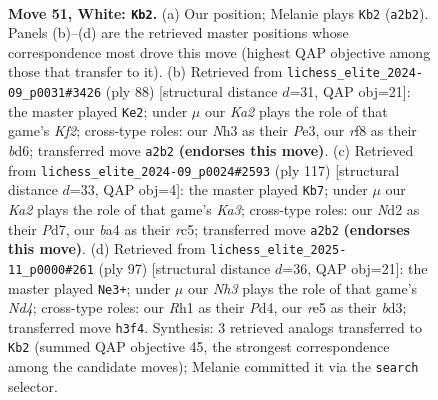 \documentclass[11pt]{article}
\begin{document}
\clearpage

\begin{figure}[p]\centering
\begin{subfigure}{0.46\textwidth}\centering
\resizebox{\linewidth}{!}{%
\newchessgame
\chessboard[
  setfen={5r2/6k1/1p6/p1p1r3/b7/2P2pPN/K2N3P/7R w - - 8 51},
  showmover=false,
  pgfstyle=straightmove, color=movearrow, markmove={a2-b2}
]}
\caption{}
\end{subfigure}\hfill
\begin{subfigure}{0.46\textwidth}\centering
\resizebox{\linewidth}{!}{%
\newchessgame
\chessboard[
  setfen={3r4/7P/p1kb1pN1/Pp2p3/2p5/4P3/P4K2/7R w - - 3 45},
  showmover=false,
  pgfstyle=straightmove, color=movearrow, markmove={f2-e2}
]}
\caption{}
\end{subfigure}
\\[4pt]
\begin{subfigure}{0.46\textwidth}\centering
\resizebox{\linewidth}{!}{%
\newchessgame
\chessboard[
  setfen={8/3p4/k3p3/2R1P3/n1PP4/7r/2KB4/8 b - - 22 59},
  showmover=false,
  pgfstyle=straightmove, color=movearrow, markmove={a6-b7}
]}
\caption{}
\end{subfigure}\hfill
\begin{subfigure}{0.46\textwidth}\centering
\resizebox{\linewidth}{!}{%
\newchessgame
\chessboard[
  setfen={8/5pk1/3p3p/3n4/3p3P/PR1B1PP1/2P3K1/r7 b - - 3 49},
  showmover=false,
  pgfstyle=straightmove, color=movearrow, markmove={d5-e3}
]}
\caption{}
\end{subfigure}
\caption{\textbf{Move 51, White: \texttt{Kb2}.} (a) Our position; Melanie plays \texttt{Kb2} (\texttt{a2b2}). Panels (b)--(d) are the retrieved master positions whose correspondence most drove this move (highest QAP objective among those that transfer to it). (b) Retrieved from \texttt{lichess\_elite\_2024-09\_p0031\#3426} (ply 88) [structural distance $d$=31, QAP obj=21]: the master played \texttt{Ke2}; under $\mu$ our \emph{Ka2} plays the role of that game's \emph{Kf2}; cross-type roles: our \emph{N}h3 as their \emph{P}e3, our \emph{r}f8 as their \emph{b}d6; transferred move \texttt{a2b2} \textbf{(endorses this move)}. (c) Retrieved from \texttt{lichess\_elite\_2024-09\_p0024\#2593} (ply 117) [structural distance $d$=33, QAP obj=4]: the master played \texttt{Kb7}; under $\mu$ our \emph{Ka2} plays the role of that game's \emph{Ka3}; cross-type roles: our \emph{N}d2 as their \emph{P}d7, our \emph{b}a4 as their \emph{r}c5; transferred move \texttt{a2b2} \textbf{(endorses this move)}. (d) Retrieved from \texttt{lichess\_elite\_2025-11\_p0000\#261} (ply 97) [structural distance $d$=36, QAP obj=21]: the master played \texttt{Ne3+}; under $\mu$ our \emph{Nh3} plays the role of that game's \emph{Nd4}; cross-type roles: our \emph{R}h1 as their \emph{P}d4, our \emph{r}e5 as their \emph{b}d3; transferred move \texttt{h3f4}. Synthesis: 3 retrieved analogs transferred to \texttt{Kb2} (summed QAP objective 45, the strongest correspondence among the candidate moves); Melanie committed it via the \texttt{search} selector.}
\label{fig:thought-m100}
\end{figure}
\end{document}
